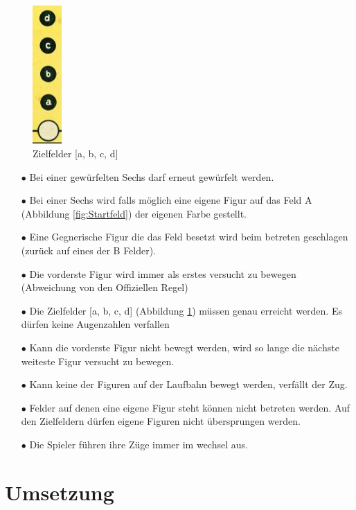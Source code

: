 \documentclass[a4paper,11pt,ngerman]{scrartcl}
\begin{document}
\begin{figure} 
	\includegraphics[width=0.1\textwidth]{goal}	
	\centering
	\caption{Zielfelder [a, b, c, d]}
	\label{fig:Zielfelder}
\end{figure}
\begin{enumerate}
	
	\item [$\bullet$] Bei einer gewürfelten Sechs darf erneut gewürfelt werden.
	\item [$\bullet$]Bei einer Sechs wird falls möglich eine eigene Figur auf das Feld A (Abbildung \ref{fig:Startfeld}) der eigenen Farbe gestellt.
	\item [$\bullet$] Eine Gegnerische Figur die das Feld besetzt wird beim betreten geschlagen (zurück auf eines der B Felder).
	\item [$\bullet$] Die vorderste Figur wird immer als erstes versucht zu bewegen (Abweichung von den Offiziellen Regel)
	\item [$\bullet$] Die Zielfelder [a, b, c, d] (Abbildung \ref{fig:Zielfelder}) müssen genau erreicht werden. Es dürfen keine \glqq Augenzahlen \grqq verfallen
	\item [$\bullet$] Kann die vorderste Figur nicht bewegt werden, wird so lange die nächste weiteste Figur versucht zu bewegen.
	\item [$\bullet$] Kann keine der Figuren auf der \glqq Laufbahn \grqq bewegt werden, verfällt der Zug.
	\item [$\bullet$] Felder auf denen eine eigene Figur steht können nicht betreten werden. Auf den Zielfeldern dürfen eigene Figuren nicht übersprungen werden.
	\item [$\bullet$] Die Spieler führen ihre Züge immer im wechsel aus.
\end{enumerate}


\section{Umsetzung}
 
\end{document}

